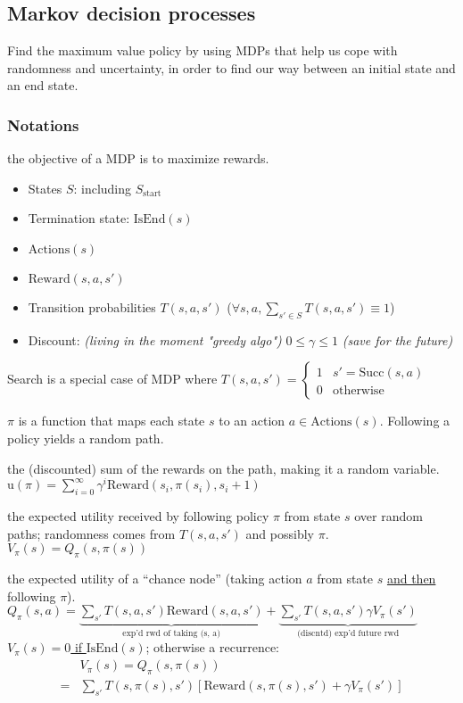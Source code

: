 \subsection{Markov decision processes}

Find the maximum value policy by using MDPs that help us cope with randomness
and uncertainty, in order to find our way between an initial state and an end
state.

\subsubsection{Notations}

 the objective of a MDP is to maximize rewards.\begin{itemize}
    \item States $S$: including $S_\text{start}$
    \item Termination state: $\text{IsEnd}(s)$
    \item $\text{Actions}(s)$
    \item $\text{Reward}(s,a,s')$
    \item Transition probabilities $T(s,a,s')$ ($\forall s,a, \sum_{s'\in S} T(s,a,s') \equiv 1$)
    \item Discount: \emph{(living in the moment "greedy algo")} $0 \le \gamma \le 1$ \emph{(save for the future)}
\end{itemize}
Search is a special case of MDP where $T(s,a,s') = \begin{cases}
    1 & s' = \text{Succ}(s,a) \\
    0 & \text{otherwise}
\end{cases}$

 $\pi$ is a function that maps each state $s$ to an action $a \in
\text{Actions}(s)$. Following a policy yields a random path.

 the (discounted) sum of the rewards on the
path, making it a random variable.
$\text{u}(\pi) = \sum_{i=0}^{\infty} \gamma^i \text{Reward}(s_i, \pi(s_i), s_i + 1)$

 the expected utility received by
following policy $\pi$ from state $s$ over random paths; randomness comes from
$T(s,a,s')$ and possibly $\pi$. $V_\pi(s) = Q_\pi(s,\pi(s))$

 the expected utility of a ``chance node'' (taking action $a$ from
state $s$ \underline{and then} following $\pi$).
$Q_\pi(s,a)
= \underbrace{\sum_{s'}T(s,a,s') \text{Reward}(s,a,s')}_{\text{exp'd rwd of taking (s, a)}}
+ \underbrace{\sum_{s'}T(s,a,s') \gamma V_\pi(s')}_{\text{(discntd) exp'd future rwd}}$
\underline{$V_\pi(s) = 0$ if $\text{IsEnd}(s)$};
otherwise a recurrence:
\begin{displaymath}
\boxed{
\begin{aligned}
    &V_\pi(s) = Q_\pi(s,\pi(s)) \\
    =&\sum_{s'}T(s,\pi(s),s')\left[\text{Reward}(s,\pi(s),s') + \gamma V_\pi(s')\right]
\end{aligned}
}
\end{displaymath}

